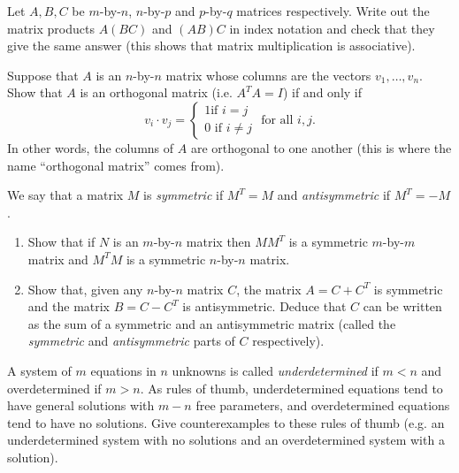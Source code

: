 \documentclass{article}
\begin{document}
\begin{Exercise}\label{exr:assoc}
Let \(A,B,C\) be \(m\)-by-\(n\), \(n\)-by-\(p\) and \(p\)-by-\(q\)
matrices respectively. Write out the matrix products \(A(BC)\) and
\((AB)C\) in index notation and check that they give the same answer
(this shows that matrix multiplication is associative).


\end{Exercise}
\begin{Exercise}\label{exr:orthogmat}
Suppose that \(A\) is an \(n\)-by-\(n\) matrix whose columns are the
vectors \(v_1,\ldots,v_n\). Show that \(A\) is an orthogonal matrix
(i.e. \(A^TA=I\)) if and only if \[v_i\cdot v_j=\begin{cases}1\mbox{
if }i=j\\0\mbox{ if }i\neq j\end{cases}\mbox{ for all }i,j.\] In
other words, the columns of \(A\) are orthogonal to one another
(this is where the name ``orthogonal matrix'' comes from).


\end{Exercise}
\begin{Exercise}\label{exr:symmantisymm}
We say that a matrix \(M\) is {\em symmetric} if \(M^T=M\) and {\em
antisymmetric} if \(M^T=-M\).
\begin{enumerate}
\item Show that if \(N\) is an \(m\)-by-\(n\) matrix then \(MM^T\) is a
symmetric \(m\)-by-\(m\) matrix and \(M^TM\) is a symmetric
\(n\)-by-\(n\) matrix.
\item Show that, given any \(n\)-by-\(n\)
matrix \(C\), the matrix \(A=C+C^T\) is symmetric and the matrix
\(B=C-C^T\) is antisymmetric. Deduce that \(C\) can be written as
the sum of a symmetric and an antisymmetric matrix (called the {\em
symmetric} and {\em antisymmetric} parts of \(C\) respectively).


\end{enumerate}
\end{Exercise}
\begin{Exercise}\label{exr:determined}
A system of \(m\) equations in \(n\) unknowns is called {\em
underdetermined} if \(m<n\) and overdetermined if \(m>n\). As rules
of thumb, underdetermined equations tend to have general solutions
with \(m-n\) free parameters, and overdetermined equations tend to
have no solutions. Give counterexamples to these rules of thumb
(e.g. an underdetermined system with no solutions and an
overdetermined system with a solution).


\end{Exercise}
\newpage
\end{document}
